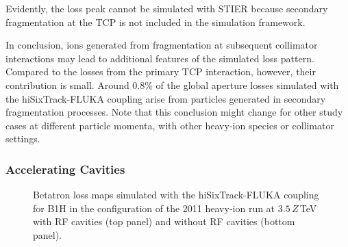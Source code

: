 Evidently, the loss peak cannot be simulated with STIER because secondary fragmentation at the TCP is not included in the simulation framework. 

In conclusion, ions generated from fragmentation at subsequent collimator interactions may lead to additional features of the simulated loss pattern. Compared to the losses from the primary TCP interaction, however, their contribution is small. Around 0.8\% of the global aperture losses simulated with the hiSixTrack-FLUKA coupling arise from particles generated in secondary fragmentation processes. Note that this conclusion might change for other study cases at different particle momenta, with other heavy-ion species or collimator settings.


\newpage
\subsubsection{Accelerating Cavities}


\begin{figure}[b]
  \centering
  \caption{Betatron loss maps simulated with the hiSixTrack-FLUKA coupling for B1H in the configuration of the 2011 heavy-ion run at $3.5\,Z\,$TeV with RF cavities (top panel) and without RF cavities (bottom panel).}  
  \label{pic:16082302}
  \end{figure}


